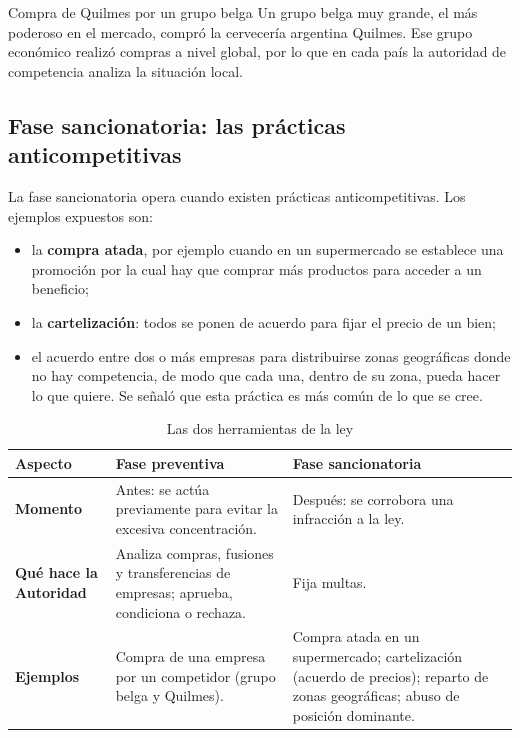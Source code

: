 \documentclass[12pt,oneside]{book}
\begin{document}
\begin{example}{Compra de Quilmes por un grupo belga}
Un grupo belga muy grande, el más poderoso en el mercado, compró la cervecería argentina Quilmes. Ese grupo económico realizó compras a nivel global, por lo que en cada país la autoridad de competencia analiza la situación local.
\end{example}

\subsection{Fase sancionatoria: las prácticas anticompetitivas}

La fase sancionatoria opera cuando existen prácticas anticompetitivas. Los ejemplos expuestos son:
\begin{itemize}
    \item la \textbf{compra atada}, por ejemplo cuando en un supermercado se establece una promoción por la cual hay que comprar más productos para acceder a un beneficio;
    \item la \textbf{cartelización}: todos se ponen de acuerdo para fijar el precio de un bien;
    \item el acuerdo entre dos o más empresas para distribuirse zonas geográficas donde no hay competencia, de modo que cada una, dentro de su zona, pueda hacer lo que quiere. Se señaló que esta práctica es más común de lo que se cree.
\end{itemize}

\begin{table}[H]
\centering
\small
\caption{Las dos herramientas de la ley}
\begin{tabularx}{\textwidth}{>{\raggedright\arraybackslash\bfseries}p{2.6cm} >{\raggedright\arraybackslash}X >{\raggedright\arraybackslash}X}
\toprule
Aspecto & Fase preventiva & Fase sancionatoria \\
\midrule
Momento & Antes: se actúa previamente para evitar la excesiva concentración. & Después: se corrobora una infracción a la ley. \\
Qué hace la Autoridad & Analiza compras, fusiones y transferencias de empresas; aprueba, condiciona o rechaza. & Fija multas. \\
Ejemplos & Compra de una empresa por un competidor (grupo belga y Quilmes). & Compra atada en un supermercado; cartelización (acuerdo de precios); reparto de zonas geográficas; abuso de posición dominante. \\
\bottomrule
\end{tabularx}
\end{table}
\end{document}
